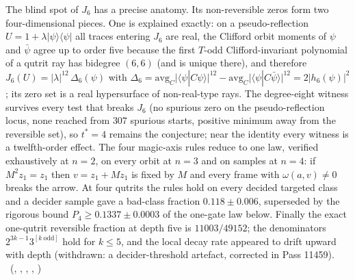 The blind spot of $J_6$ has a precise anatomy. Its non-reversible zeros form two four-dimensional pieces. One is explained
exactly: on a pseudo-reflection $U=1+\lambda\lvert\psi\rangle\langle\psi\rvert$ all traces entering $J_6$ are real, the Clifford orbit
moments of $\psi$ and $\bar\psi$ agree up to order five because the first $T$-odd Clifford-invariant polynomial of a qutrit ray has
bidegree $(6,6)$ (and is unique there), and therefore $J_6(U)=\lvert\lambda\rvert^{12}\,\Delta_6(\psi)$ with
$\Delta_6=\mathrm{avg}_C\lvert\langle\psi|C\psi\rangle\rvert^{12}-\mathrm{avg}_C\lvert\langle\psi|C\bar\psi\rangle\rvert^{12}=2\lvert h_6(\psi)\rvert^2$; its zero set is a
real hypersurface of non-real-type rays. The degree-eight witness survives every test that breaks $J_6$ (no spurious zero on the
pseudo-reflection locus, none reached from $307$ spurious starts, positive minimum away from the reversible set), so $t^\ast=4$
remains the conjecture; near the identity every witness is a twelfth-order effect. The four magic-axis rules reduce to one
law, verified exhaustively at $n=2$, on every orbit at $n=3$ and on samples at $n=4$: if $M^2z_1=z_1$ then $v=z_1+Mz_1$ is fixed
by $M$ and every frame with $\omega(a,v)\neq0$ breaks the arrow. At four qutrits the rules hold on every decided targeted class
and a decider sample gave a bad-class fraction $0.118\pm0.006$, superseded by the rigorous bound $P_4\ge0.1337\pm0.0003$ of the one-gate law below. Finally the exact one-qutrit reversible
fraction at depth five is $11003/49152$; the denominators $2^{3k-1}3^{[k\ \mathrm{odd}]}$ hold for $k\le5$, and the local decay rate
appeared to drift upward with depth (withdrawn: a decider-threshold artefact, corrected in Pass 11459). \tierT\,\tierC\ (,
, ,
, )

